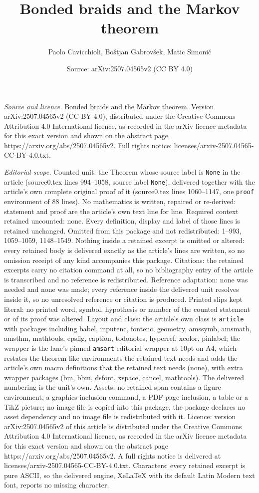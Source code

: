 \documentclass[10pt,a4paper]{amsart}
\title[Bonded braids and the Markov theorem]{Bonded braids and the Markov theorem}
\author{Paolo Cavicchioli, Bo\v{s}tjan Gabrov\v{s}ek, Matic Simoni\v{c}}
\date{Source: arXiv:2507.04565v2 (CC BY 4.0)}
\begin{document}
\maketitle

\noindent\emph{Source and licence.} Bonded braids and the Markov theorem. Version arXiv:2507.04565v2 (CC BY 4.0), distributed under the Creative Commons Attribution 4.0 International licence, as recorded in the arXiv licence metadata for this exact version and shown on the abstract page https://arxiv.org/abs/2507.04565v2. Full rights notice: licenses/arxiv-2507.04565-CC-BY-4.0.txt.\par\smallskip

\noindent\textit{Editorial scope.} Counted unit: the Theorem whose source label is \texttt{None} in the article (source0.tex lines 994--1058, source label \texttt{None}), delivered together with the article's own complete original proof of it (source0.tex lines 1060--1147, one \texttt{proof} environment of 88 lines). No mathematics is written, repaired or re-derived: statement and proof are the article's own text line for line. Required context retained uncounted: none. Every definition, display and label of those lines is retained unchanged. Omitted from this package and not redistributed: 1--993, 1059--1059, 1148--1549. Nothing inside a retained excerpt is omitted or altered: every retained body is delivered exactly as the article's lines are written, so no omission receipt of any kind accompanies this package. Citations: the retained excerpts carry no citation command at all, so no bibliography entry of the article is transcribed and no reference is redistributed. Reference adaptation: none was needed and none was made; every reference inside the delivered unit resolves inside it, so no unresolved reference or citation is produced. Printed slips kept literal: no printed word, symbol, hypothesis or number of the counted statement or of its proof was altered. Layout and class: the article's own class is \texttt{article} with packages including babel, inputenc, fontenc, geometry, amssymb, amsmath, amsthm, mathtools, epsfig, caption, todonotes, hyperref, xcolor, pinlabel; the wrapper is the lane's pinned \texttt{amsart} editorial wrapper at 10pt on A4, which restates the theorem-like environments the retained text needs and adds the article's own macro definitions that the retained text needs (none), with extra wrapper packages (bm, bbm, dsfont, xspace, cancel, mathtools). The delivered numbering is the unit's own. Assets: no retained span contains a figure environment, a graphics-inclusion command, a PDF-page inclusion, a table or a TikZ picture; no image file is copied into this package, the package declares no asset dependency and no image file is redistributed with it. Licence: version arXiv:2507.04565v2 of this article is distributed under the Creative Commons Attribution 4.0 International licence, as recorded in the arXiv licence metadata for this exact version and shown on the abstract page https://arxiv.org/abs/2507.04565v2. A full rights notice is delivered at licenses/arxiv-2507.04565-CC-BY-4.0.txt. Characters: every retained excerpt is pure ASCII, so the delivered engine, XeLaTeX with its default Latin Modern text font, reports no missing character.
\end{document}
